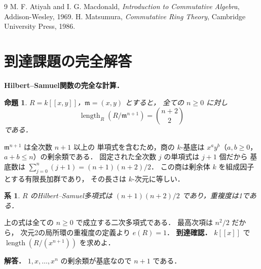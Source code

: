 \documentclass[a5paper,10pt,onecolumn]{jsarticle}
\makeatletter
\theoremstyle{mathnotetheorem}
\newtheorem{proposition}[theorem]{命題}
\newtheorem{corollary}[theorem]{系}
\renewcommand{\proofname}{証明}
\renewenvironment{proof}[1][\proofname]{%
  \par\pushQED{\qed}\normalfont\topsep4\p@\@plus2\p@\relax
  \trivlist\item[\hskip\labelsep\bfseries #1]\ignorespaces
}{\popQED\endtrivlist\@endpefalse}
\makeatother
\begin{document}
\begin{thebibliography}{9}
 M. F. Atiyah and I. G. Macdonald,
 \emph{Introduction to Commutative Algebra}, Addison-Wesley, 1969.
 H. Matsumura,
 \emph{Commutative Ring Theory}, Cambridge University Press, 1986.
\end{thebibliography}

\section{到達課題の完全解答}
\noindent\textbf{Hilbert--Samuel関数の完全な計算．}
\begin{proposition}
$R=k[[x,y]]$，$\mathfrak m=(x,y)$ とすると，
全ての $n\ge0$ に対し
\[
\operatorname{length}_R(R/\mathfrak m^{n+1})
=\binom{n+2}{2}
\]
である．
\end{proposition}
\begin{proof}
$\mathfrak m^{n+1}$ は全次数 $n+1$ 以上の
単項式を含むため，商の $k$-基底は
$x^ay^b$（$a,b\ge0$，$a+b\le n$）の剰余類である．
固定された全次数 $j$ の単項式は $j+1$ 個だから
基底数は
$\sum_{j=0}^n(j+1)=(n+1)(n+2)/2$．
この商は剰余体 $k$ を組成因子とする有限長加群であり，
その長さは $k$-次元に等しい．
\end{proof}
\begin{corollary}
$R$ のHilbert--Samuel多項式は
$(n+1)(n+2)/2$ であり，重複度は1である．
\end{corollary}
\begin{proof}
上の式は全ての $n\ge0$ で成立する二次多項式である．
最高次項は $n^2/2$ だから，
次元2の局所環の重複度の定義より $e(R)=1$．
\end{proof}
\noindent\textbf{到達確認．}
$k[[x]]$ で $\operatorname{length}(R/(x^{n+1}))$
を求めよ．
\par\noindent\textbf{解答．}
$1,x,\dots,x^n$ の剰余類が基底なので $n+1$ である．
\end{document}
